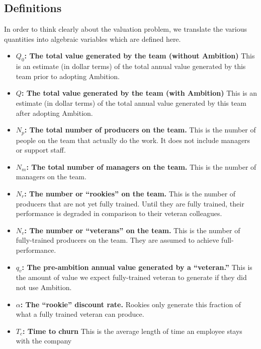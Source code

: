 \documentclass[paper=a4, fontsize=11pt abstract]{scrartcl}
\numberwithin{equation}{section}		%
\numberwithin{figure}{section}			%
\numberwithin{table}{section}				%
\begin{document}
\subsection{Definitions}
In order to think clearly about the valuation problem, we translate the various quantities into algebraic variables which are defined here.
\begin{itemize}
    \item $Q_0$\textbf{: The total value generated by the team (without Ambition)}
    This is an estimate (in dollar terms) of the total annual value generated by this team prior to adopting Ambition.
    
    \item $Q$\textbf{: The total value generated by the team (with Ambition)}
    This is an estimate (in dollar terms) of the total annual value generated by this team after adopting Ambition.
    
    \item $N_p$\textbf{: The total number of producers on the team.}
    This is the number of people on the team that actually do the work.  It does not include managers or support staff.
    
    \item $N_m$\textbf{: The total number of managers on the team.}  This is the number of managers on the team.
    
    \item $N_r$\textbf{: The number or ``rookies'' on the team.}  This is the number of producers that are not yet fully trained.  Until they are fully trained, their performance is degraded in comparison to their veteran colleagues.
    
    \item $N_v$\textbf{: The number or ``veterans'' on the team.}  This is the number of fully-trained producers on the team. They are assumed to achieve full-performance.
    
    \item $q_{v}$\textbf{: The pre-ambition annual value generated by a ``veteran.''}  This is the amount of value we expect fully-trained veteran to generate if they did not use Ambition.
    
    \item $\alpha$\textbf{: The ``rookie'' discount rate.}  Rookies only generate this fraction of what a fully trained veteran can produce.
    
    \item $T_c$\textbf{: Time to churn} This is the average length of time an employee stays with the company
    

\end{itemize}
\end{document}
